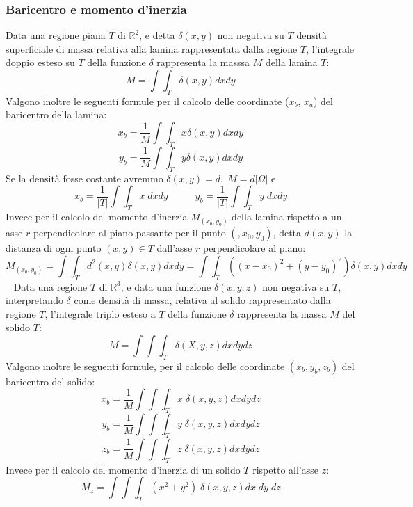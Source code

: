 \subsubsection{Baricentro e momento d'inerzia}
Data una regione piana $T$ di $\mathbb{R}^2$, e detta $\delta (x,y)$ non negativa su $T$ densità superficiale di massa relativa alla lamina rappresentata dalla regione $T$, l'integrale doppio esteso su $T$ della funzione $\delta$ rappresenta la masssa $M$ della lamina $T$:
\[
    M = \int \int_{T} \delta(x,y) dx dy
\]
Valgono inoltre le seguenti formule per il calcolo delle coordinate ($x_b$, $x_a$) del baricentro della lamina:
\[
    x_b = \frac{1}{M}\int \int_{T} x \delta(x,y)dxdy
\]
\[
    y_b= \frac{1}{M} \int \int_{T} y \delta(x,y)dxdy
\]
Se la densità fosse costante avremmo $\delta(x,y) = d, \; M = d|\Omega|$ e 
\[
    x_b = \frac{1}{|T|} \int \int_{T} x \;dxdy \;\;\;\;\;\;\;\;\;\; y_b =\frac{1}{|T|} \int \int_{T} y \;dxdy
\]
Invece per il calcolo del momento d'inerzia $M_{(x_0, y_0)}$ della lamina rispetto a un asse $r$ perpendicolare al piano passante per il punto $(,x_0, y_0)$, detta $d(x,y)$ la distanza di ogni punto $(x,y) \in T$ dall'asse $r$ perpendicolare al piano:
\[
    M_{(x_0, y_0)} =\int \int_{T}d^2(x,y) \delta(x,y) dxdy = \int \int_{T}((x-x_0)^2 + (y-y_0)^2) \delta(x,y) dxdy
\]
\ \newline
\newline
Data una regione $T$ di $\mathbb{R}^3$, e data una funzione $\delta(x,y,z)$ non negativa su $T$, interpretando $\delta$ come densità di massa, relativa al solido rappresentato dalla regione $T$, l'integrale triplo esteso a $T$ della funzione $\delta$ rappresenta la massa $M$ del solido $T$:
\[
    M = \int \int \int_{T} \delta(X,y,z)dx dy dz
\]
Valgono inoltre le seguenti formule, per il calcolo delle coordinate $(x_b, y_b, z_b)$ del baricentro del solido:
\[
    x_b = \frac{1}{M} \int \int \int_{T} x \; \delta(x,y,z) dx dy dz
\]
\[
    y_b = \frac{1}{M} \int \int \int_{T} y \; \delta(x,y,z)dx dy dz
\]
\[
    z_b = \frac{1}{M} \int \int \int_{T} z \; \delta(x,y,z)dx dy dz
\]
Invece per il calcolo del momento d'inerzia di un solido $T$ rispetto all'asse $z$:
\[
    M_z = \int \int \int_{T} (x^2+y^2) \; \delta(x,y,z) dx \; dy \; dz
\]
